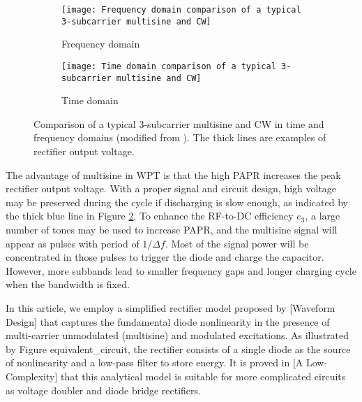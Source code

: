 \begin{figure}
  \centering

  \begin{subfigure}{.5\texiwidth}
    \centering
      \texttt{[image: Frequency domain comparison of a typical 3-subcarrier multisine and CW]}
    \caption{Frequency domain}
    \label{fig:frequency_domain}
  \end{subfigure}

  \begin{subfigure}{.5\texiwidth}
    \centering
      \texttt{[image: Time domain comparison of a typical 3-subcarrier multisine and CW]}
    \caption{Time domain}
    \label{fig:time_domain}
  \end{subfigure}

  \caption{Comparison of a typical 3-subcarrier multisine and CW in time and frequency domains (modified from \cite{Trotter2009}). The thick lines are examples of rectifier output voltage.}
  \label{fig:waveform_comparison}
\end{figure}

The advantage of multisine in WPT is that the high PAPR increases the peak rectifier output voltage. With a proper signal and circuit design, high voltage may be preserved during the cycle if discharging is slow enough, as indicated by the thick blue line in Figure \ref{fig:time_domain}. To enhance the RF-to-DC efficiency ${e_3}$, a large number of tones may be used to increase PAPR, and the multisine signal will appear as pulses with period of $1/\Delta f$. Most of the signal power will be concentrated in those pulses to trigger the diode and charge the capacitor. However, more subbands lead to smaller frequency gaps and longer charging cycle when the bandwidth is fixed.





























In this article, we employ a simplified rectifier model proposed by [Waveform Design] that captures the fundamental diode nonlinearity in the presence of multi-carrier unmodulated (multisine) and modulated excitations. As illustrated by Figure {equivalent_circuit}, the rectifier consists of a single diode as the source of nonlinearity and a low-pass filter to store energy. It is proved in [A Low-Complexity] that this analytical model is suitable for more complicated circuits as voltage doubler and diode bridge rectifiers. 